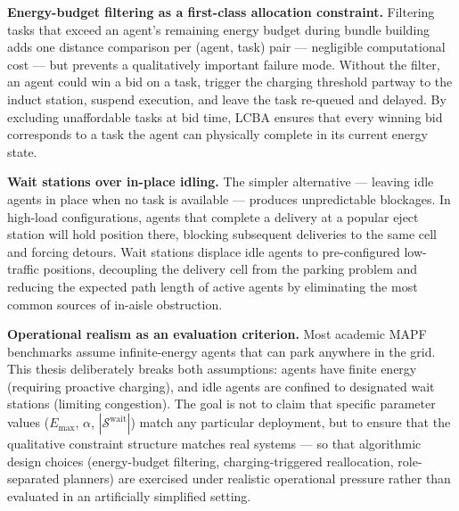 \textbf{Energy-budget filtering as a first-class allocation constraint.}
Filtering tasks that exceed an agent's remaining energy budget during bundle
building adds one distance comparison per (agent, task) pair --- negligible
computational cost --- but prevents a qualitatively important failure mode.
Without the filter, an agent could win a bid on a task, trigger the charging
threshold partway to the induct station, suspend execution, and leave the
task re-queued and delayed.
By excluding unaffordable tasks at bid time, LCBA ensures that every winning
bid corresponds to a task the agent can physically complete in its current
energy state.

\textbf{Wait stations over in-place idling.}
The simpler alternative --- leaving idle agents in place when no task is
available --- produces unpredictable blockages.
In high-load configurations, agents that complete a delivery at a popular
eject station will hold position there, blocking subsequent deliveries to the
same cell and forcing detours.
Wait stations displace idle agents to pre-configured low-traffic positions,
decoupling the delivery cell from the parking problem and reducing the
expected path length of active agents by eliminating the most common
sources of in-aisle obstruction.

\textbf{Operational realism as an evaluation criterion.}
Most academic MAPF benchmarks assume infinite-energy agents that can park
anywhere in the grid.
This thesis deliberately breaks both assumptions: agents have finite energy
(requiring proactive charging), and idle agents are confined to designated
wait stations (limiting congestion).
The goal is not to claim that specific parameter values
($E_{\max}$, $\alpha$, $|\mathcal{S}^{\text{wait}}|$) match any particular
deployment, but to ensure that the qualitative constraint structure
matches real systems --- so that algorithmic design choices (energy-budget
filtering, charging-triggered reallocation, role-separated planners)
are exercised under realistic operational pressure rather than evaluated
in an artificially simplified setting.
